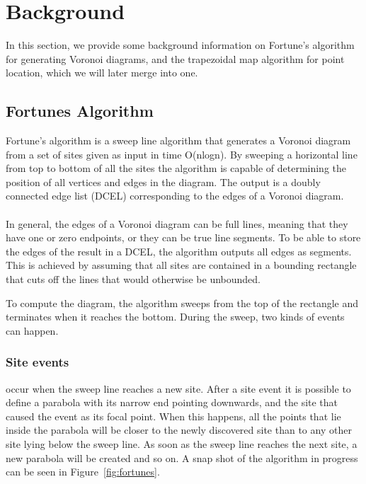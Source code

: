 \section{Background}
\label{background}

In this section, we provide some background information on Fortune's algorithm for generating Voronoi diagrams, and the trapezoidal map algorithm for point location, which we will later merge into one.

\subsection{Fortunes Algorithm}
Fortune’s algorithm is a sweep line algorithm that generates a Voronoi diagram from a set of sites given as input in time O(nlogn). By sweeping a horizontal line from top to bottom of all the sites the algorithm is capable of determining the position of all vertices and edges in the diagram. The output is a doubly connected edge list (DCEL) corresponding to the edges of a Voronoi diagram.

\paragraph{}
In general, the edges of a Voronoi diagram can be full lines, meaning that they have one or zero endpoints, or they can be true line segments. To be able to store the edges of the result in a DCEL, the algorithm outputs all edges as segments. This is achieved by assuming that all sites are contained in a bounding rectangle that cuts off the lines that would otherwise be unbounded.

To compute the diagram, the algorithm sweeps from the top of the rectangle and terminates when it reaches the bottom. During the sweep, two kinds of events can happen. 

\subsubsection{Site events}
occur when the sweep line reaches a new site. After a site event it is possible to define a parabola with its narrow end pointing downwards, and the site that caused the event as its focal point. When this happens, all the points that lie inside the parabola will be closer to the newly discovered site than to any other site lying below the sweep line. As soon as the sweep line reaches the next site, a new parabola will be created and so on. A snap shot of the algorithm in progress can be seen in Figure~\ref{fig:fortunes}.

